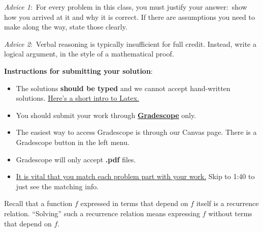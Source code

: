 \documentclass[9pt]{article}
\date{}
\begin{document}
\renewcommand{\headrulewidth}{0.5pt}

\phantom{Test}

\begin{small}
\textit{Advice 1}:\ For every problem in this class, you must justify your answer:\ show how you arrived at it and why it is correct. If there are assumptions you need to make along the way, state those clearly.
\vspace{-3mm} 

\textit{Advice 2}:\ Verbal reasoning is typically insufficient for full credit. Instead, write a logical argument, in the style of a mathematical proof.\\
\vspace{-3mm} 

\textbf{Instructions for submitting your solution}:
\vspace{-5mm} 

\begin{itemize}
	\item The solutions \textbf{should be typed} and we cannot accept hand-written solutions. \href{http://ece.uprm.edu/~caceros/latex/introduction.pdf}{Here's a short intro to Latex.}
	\item You should submit your work through \href{https://www.gradescope.com/courses/218966}{\textbf{Gradescope}} only.
	\item The easiest way to access Gradescope is through our Canvas page. There is a Gradescope button in the left menu.
	\item Gradescope will only accept \textbf{.pdf} files.
	\item \href{https://www.youtube.com/watch?v=u-pK4GzpId0&feature=emb_logo}{It is vital that you match each problem part with your work.} Skip to 1:40 to just see the matching info.
\end{itemize}
\vspace{-4mm} 
\end{small}

\hrulefill
\pagebreak

Recall that a function $f$ expressed in terms that depend on $f$ itself is a recurrence relation.  ``Solving'' such a recurrence relation means expressing $f$ without terms that depend on $f$.
\end{document}
